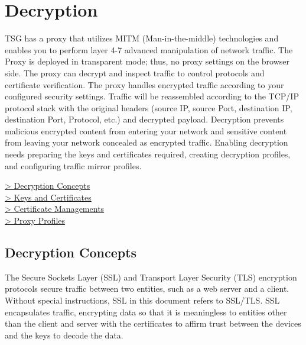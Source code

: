 %
\chapter*{\hypertarget{link:Decryption}{Decryption}}
\label{sec:decrypt}

TSG has a proxy that utilizes MITM (Man-in-the-middle) technologies and enables you to perform layer 4-7 advanced manipulation of network traffic. 
The Proxy is deployed in transparent mode; thus, no proxy settings on the browser side. 
The proxy can decrypt and inspect traffic to control protocols and certificate verification. 
The proxy handles encrypted traffic according to your configured security settings. 
Traffic will be reassembled according to the TCP/IP protocol stack with the original headers 
(source IP, source Port, destination IP, destination Port, Protocol, etc.) and decrypted payload. 
Decryption prevents malicious encrypted content from entering your network and sensitive content from leaving your network concealed as encrypted traffic. 
Enabling decryption needs preparing the keys and certificates required, creating decryption profiles, and configuring traffic mirror profiles.

{
\color{linkblue}
\hyperlink{link:Decryption Concepts}{> Decryption Concepts} \\
\hyperlink{link:Keys and Certificates}{> Keys and Certificates} \\
\hyperlink{link:Certificate Managements}{> Certificate Managements}\\
\hyperlink{link:Proxy Profiles}{> Proxy Profiles}\\
}
\clearpage

\section*{\hypertarget{link:Decryption Concepts}{Decryption Concepts}}
\label{sec:decrypt:concept}

The Secure Sockets Layer (SSL) and Transport Layer Security (TLS) encryption protocols secure traffic between two entities, such as a web server and a client. 
Without special instructions, SSL in this document refers to SSL/TLS. SSL encapsulates traffic, encrypting data so that it is meaningless to 
entities other than the client and server with the certificates to affirm trust between the devices and the keys to decode the data.


